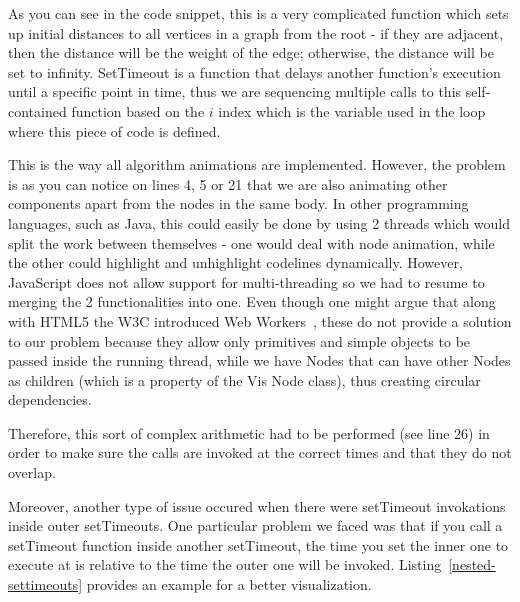 \documentclass{l4proj}
\begin{document}
As you can see in the code snippet, this is a very complicated function which sets up initial distances to all vertices in a graph from
the root - if they are adjacent, then the distance will be the weight of the edge; otherwise, the distance will be set
to infinity. SetTimeout is a function that delays another function's execution until a specific point in time, thus we are sequencing
multiple calls to this self-contained function based on the $i$ index which is the variable used in the loop where
this piece of code is defined. 

This is the way all algorithm animations are implemented. However, the problem is as you can notice on lines 4, 5 or 21
that we are also animating other components apart from the nodes in the same body. In other programming languages, such as Java, this
could easily be done by using 2 threads which would split the work between themselves - one would deal with node
animation, while the other could highlight and unhighlight codelines dynamically. However, JavaScript does not allow
support for multi-threading so we had to resume to merging the 2 functionalities into one. Even though one might argue
that along with HTML5 the W3C introduced Web Workers~\cite{web-worker}, these do not provide a solution to our problem
because they allow only primitives and simple objects to be passed inside the running thread, while we have Nodes that
can have other Nodes as children (which is a property of the Vis Node class), thus creating circular dependencies.

Therefore, this sort of complex arithmetic had to be performed (see line 26) in order to make sure the calls are invoked at
the correct times and that they do not overlap.

Moreover, another type of issue occured when there were setTimeout invokations inside outer setTimeouts. One particular
problem we faced was that if you call a setTimeout function inside another setTimeout, the time you set the inner one
to execute at is relative to the time the outer one will be invoked. Listing~\ref{nested-settimeouts} provides an example for a better
visualization.
\end{document}
